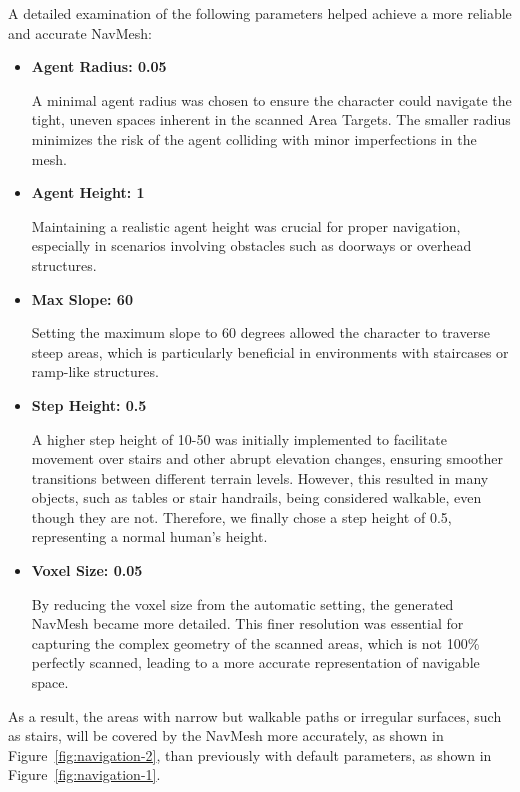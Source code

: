 A detailed examination of the following parameters helped achieve a more reliable and accurate NavMesh:

\begin{itemize} 
\item \textbf{Agent Radius: 0.05}

A minimal agent radius was chosen to ensure the character could navigate the tight, uneven spaces inherent in the scanned Area Targets. The smaller radius minimizes the risk of the agent colliding with minor imperfections in the mesh.

\item \textbf{Agent Height: 1}  

Maintaining a realistic agent height was crucial for proper navigation, especially in scenarios involving obstacles such as doorways or overhead structures.

\item \textbf{Max Slope: 60}  

Setting the maximum slope to 60 degrees allowed the character to traverse steep areas, which is particularly beneficial in environments with staircases or ramp-like structures.

\item \textbf{Step Height: 0.5}

A higher step height of 10-50 was initially implemented to facilitate movement over stairs and other abrupt elevation changes, ensuring smoother transitions between different terrain levels. However, this resulted in many objects, such as tables or stair handrails, being considered walkable, even though they are not. Therefore, we finally chose a step height of 0.5, representing a normal human's height.

\item \textbf{Voxel Size: 0.05}  

By reducing the voxel size from the automatic setting, the generated NavMesh became more detailed. This finer resolution was essential for capturing the complex geometry of the scanned areas, which is not 100\% perfectly scanned, leading to a more accurate representation of navigable space.
\end{itemize}

As a result, the areas with narrow but walkable paths or irregular surfaces, such as stairs, will be covered by the NavMesh more accurately, as shown in Figure~\ref{fig:navigation-2}, than previously with default parameters, as shown in Figure~\ref{fig:navigation-1}.

